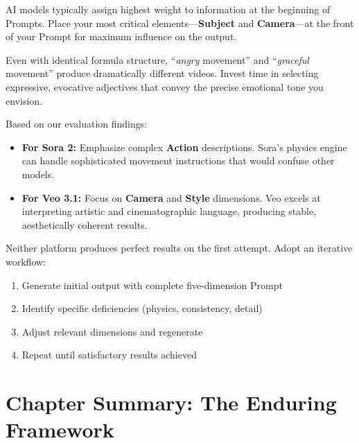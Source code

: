 \begin{tipbox}
AI models typically assign highest weight to information at the beginning of Prompts. Place your most critical elements---\textbf{Subject} and \textbf{Camera}---at the front of your Prompt for maximum influence on the output.
\end{tipbox}

\begin{tipbox}
Even with identical formula structure, ``\textit{angry} movement'' and ``\textit{graceful} movement'' produce dramatically different videos. Invest time in selecting expressive, evocative adjectives that convey the precise emotional tone you envision.
\end{tipbox}

\begin{tipbox}
Based on our evaluation findings:
\begin{itemize}
    \item \textbf{For Sora 2:} Emphasize complex \textbf{Action} descriptions. Sora's physics engine can handle sophisticated movement instructions that would confuse other models.
    \item \textbf{For Veo 3.1:} Focus on \textbf{Camera} and \textbf{Style} dimensions. Veo excels at interpreting artistic and cinematographic language, producing stable, aesthetically coherent results.
\end{itemize}
\end{tipbox}

\begin{tipbox}
Neither platform produces perfect results on the first attempt. Adopt an iterative workflow:
\begin{enumerate}
    \item Generate initial output with complete five-dimension Prompt
    \item Identify specific deficiencies (physics, consistency, detail)
    \item Adjust relevant dimensions and regenerate
    \item Repeat until satisfactory results achieved
\end{enumerate}
\end{tipbox}

\section{Chapter Summary: The Enduring Framework}
\label{sec:chapter-summary}


